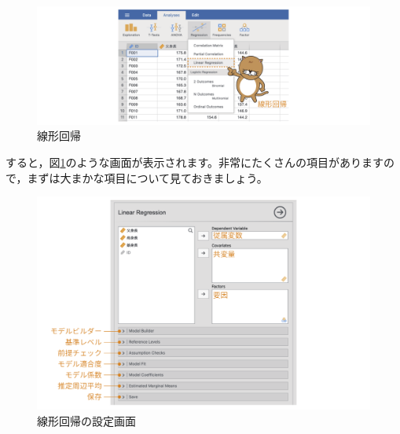 \documentclass[
  12pt,
  a5jpaper,
  lualatex, ja=standard]{bxjsbook}
\begin{document}
\begin{figure}[!ht]

{\centering \includegraphics[width=1\linewidth]{images/regression/lr-menu} 

}

\caption{線形回帰}\label{fig:regression-LR-menu}
\end{figure}

すると，図\ref{fig:regression-LR-menu}のような画面が表示されます。非常にたくさんの項目がありますので，まずは大まかな項目について見ておきましょう。

\begin{figure}[!ht]

{\centering \includegraphics[width=1\linewidth]{images/regression/lr-setting} 

}

\caption{線形回帰の設定画面}\label{fig:regression-LR}
\end{figure}
\end{document}
